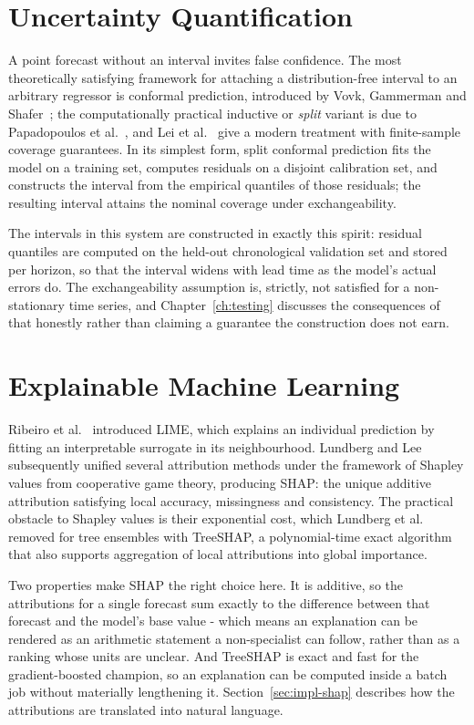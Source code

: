 \section{Uncertainty Quantification}
A point forecast without an interval invites false confidence. The most
theoretically satisfying framework for attaching a distribution-free interval to
an arbitrary regressor is conformal prediction, introduced by Vovk, Gammerman and
Shafer~\cite{ref:conformal}; the computationally practical inductive or
\emph{split} variant is due to Papadopoulos et al.~\cite{ref:inductive}, and Lei
et al.~\cite{ref:leiconformal} give a modern treatment with finite-sample
coverage guarantees. In its simplest form, split conformal prediction fits the
model on a training set, computes residuals on a disjoint calibration set, and
constructs the interval from the empirical quantiles of those residuals; the
resulting interval attains the nominal coverage under exchangeability.

The intervals in this system are constructed in exactly this spirit: residual
quantiles are computed on the held-out chronological validation set and stored
per horizon, so that the interval widens with lead time as the model's actual
errors do. The exchangeability assumption is, strictly, not satisfied for a
non-stationary time series, and Chapter~\ref{ch:testing} discusses the
consequences of that honestly rather than claiming a guarantee the construction
does not earn.

\section{Explainable Machine Learning}
Ribeiro et al.~\cite{ref:lime} introduced LIME, which explains an individual
prediction by fitting an interpretable surrogate in its neighbourhood. Lundberg
and Lee~\cite{ref:shap} subsequently unified several attribution methods under
the framework of Shapley values from cooperative game theory, producing SHAP: the
unique additive attribution satisfying local accuracy, missingness and
consistency. The practical obstacle to Shapley values is their exponential cost,
which Lundberg et al.~\cite{ref:treeshap} removed for tree ensembles with
TreeSHAP, a polynomial-time exact algorithm that also supports aggregation of
local attributions into global importance.

Two properties make SHAP the right choice here. It is additive, so the
attributions for a single forecast sum exactly to the difference between that
forecast and the model's base value - which means an explanation can be rendered
as an arithmetic statement a non-specialist can follow, rather than as a
ranking whose units are unclear. And TreeSHAP is exact and fast for the
gradient-boosted champion, so an explanation can be computed inside a batch job
without materially lengthening it. Section~\ref{sec:impl-shap} describes how the
attributions are translated into natural language.

